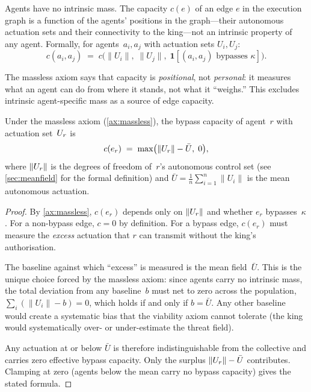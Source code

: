 \begin{axiom}\label{ax:massless}
Agents have no intrinsic mass.  The capacity $c(e)$ of an edge $e$
in the execution graph is a function of the agents' positions in the
graph---their autonomous actuation sets and their connectivity to the
king---not an intrinsic property of any agent.  Formally, for
agents~$a_i, a_j$ with actuation sets $U_i, U_j$:
\[
  c(a_i, a_j) \;=\; c\bigl(\|U_i\|,\; \|U_j\|,\;
  \mathbf{1}[(a_i, a_j) \text{ bypasses } \kappa]\bigr).
\]
\end{axiom}

The massless axiom says that capacity is \emph{positional}, not
\emph{personal}: it measures what an agent can do from where it
stands, not what it ``weighs.''  This excludes intrinsic agent-specific
mass as a source of edge capacity.

\begin{lemma}\label{lem:capacity}
Under the massless axiom (\cref{ax:massless}), the bypass capacity
of agent~$r$ with actuation set~$U_r$ is
\[
  c(e_r) \;=\; \max\bigl(\|U_r\| - \bar{U},\; 0\bigr),
\]
where $\|U_r\|$ is the degrees of freedom of~$r$'s autonomous
control set (see \cref{sec:meanfield} for the formal definition)
and $\bar{U} = \frac{1}{n}\sum_{i=1}^{n}\|U_i\|$ is the mean
autonomous actuation.
\end{lemma}

\begin{proof}
By \cref{ax:massless}, $c(e_r)$ depends only on $\|U_r\|$ and
whether $e_r$ bypasses~$\kappa$.  For a non-bypass edge, $c = 0$ by
definition.  For a bypass edge, $c(e_r)$ must measure the
\emph{excess} actuation that $r$ can transmit without the king's
authorisation.

The baseline against which ``excess'' is measured is the mean
field~$\bar{U}$.  This is the unique choice forced by the massless
axiom: since agents carry no intrinsic mass, the total deviation
from any baseline~$b$ must net to zero across the population,
$\sum_i (\|U_i\| - b) = 0$, which holds if and only if
$b = \bar{U}$.  Any other baseline would create a systematic bias
that the viability axiom cannot tolerate (the king would
systematically over- or under-estimate the threat field).

Any actuation at or below $\bar{U}$ is therefore indistinguishable
from the collective and carries zero effective bypass capacity.
Only the surplus $\|U_r\| - \bar{U}$ contributes.  Clamping at zero
(agents below the mean carry no bypass capacity) gives the stated
formula.
\end{proof}

